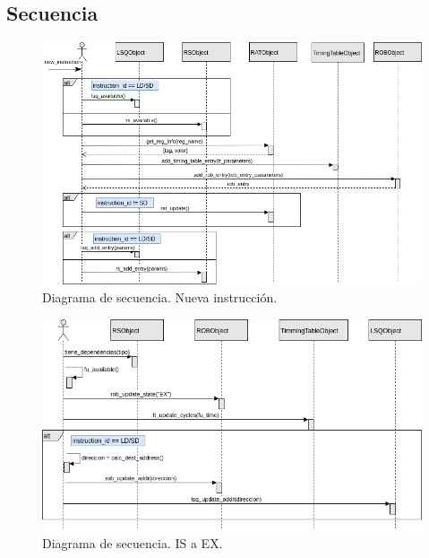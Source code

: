 \documentclass[a4paper]{article}
\begin{document}
	\subsection*{Secuencia}

	\begin{figure}[H]
		\centering
		\includegraphics[width=1\textwidth]{figures/sec_issue.png}
		\caption{\label{fig:sec_issue}Diagrama de secuencia. Nueva instrucción.}
	\end{figure}

	\begin{figure}[H]
		\centering
		\includegraphics[width=1\textwidth]{figures/issue_ex.png}
		\caption{\label{fig:issue_ex}Diagrama de secuencia. IS a EX.}
	\end{figure}
\end{document}
